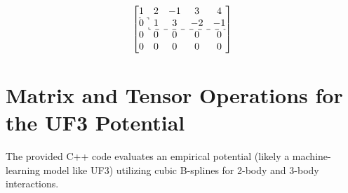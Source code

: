\documentclass[12pt]{article}
\begin{document}
\[
  \left[
    \begin{array}{@{} c c c c c @{}}
      1 & 2 & -1 &  3 &  4 \\
      \cdashline{1-1}
      0 & \multicolumn{1}{: c}{1} &  3 & -2 & -1 \\
      \cdashline{2-5}
      0 & 0 &  0 &  0 &  0 \\
      0 & 0 &  0 &  0 &  0
    \end{array}
  \right]
\]















































































\large
\section*{Matrix and Tensor Operations for the UF3 Potential}

The provided C++ code evaluates an empirical potential (likely a machine-learning model like UF3) utilizing cubic B-splines for 2-body and 3-body interactions. 
\end{document}
